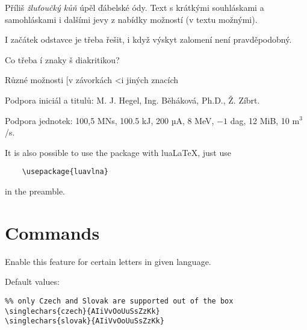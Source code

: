 \documentclass[12pt]{ltxdoc}
\newenvironment{mycode}{
	\medskip%
	\parindent=0pt%
}{\medskip}
\begin{document}

\noindent
\begin{minipage}{3in}
\preventsingledebugon
{}
Příliš \textit{žluťoučký kůň} úpěl ďábelské ódy. 
Text s krátkými souhláskami a samohláskami i dalšími jevy z nabídky možností (v textu možnými). 

I začátek odstavce je třeba řešit, i když výskyt zalomení není pravděpodobný.

Co třeba í znaky š diakritikou?

Různé možnosti [v závorkách \textless i jiných znacích

Podpora iniciál a titulů: M. J. Hegel, Ing. Běháková, Ph.D., Ž. Zíbrt.

Podpora jednotek: 100,5 MN\cdot{}s, 100.5 kJ, 200 µA, 8 MeV, $-1$ dag, 12 MiB, 10 m$^3$/s.

\preventsingledebugoff
\end{minipage}

\bigskip
It is also possible to use the package with lua\LaTeX, just use

\begin{verbatim}
	\usepackage{luavlna}
\end{verbatim}

in the preamble.

\section{Commands}

\begin{mycode}
\cmd{\singlechars} 
\end{mycode}

Enable this feature for certain letters in given language. 

Default values:

\begin{mycode}
\begin{verbatim}
%% only Czech and Slovak are supported out of the box
\singlechars{czech}{AIiVvOoUuSsZzKk}
\singlechars{slovak}{AIiVvOoUuSsZzKk}
\end{verbatim}
\end{mycode}

\end{document}
